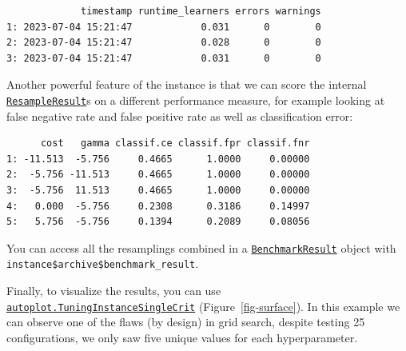 \begin{verbatim}
             timestamp runtime_learners errors warnings
1: 2023-07-04 15:21:47            0.031      0        0
2: 2023-07-04 15:21:47            0.028      0        0
3: 2023-07-04 15:21:47            0.031      0        0
\end{verbatim}

Another powerful feature of the instance is that we can score the
internal
\href{https://mlr3.mlr-org.com/reference/ResampleResult.html}{\texttt{ResampleResult}}s
on a different performance measure, for example looking at false
negative rate and false positive rate as well as classification error:

\begin{Shaded}
\begin{Highlighting}[]
\SpecialCharTok{$}
   \NormalTok{(}\NormalTok{(}\NormalTok{, }\NormalTok{)))[}\SpecialCharTok{:}\NormalTok{ ,}
\NormalTok{  .(cost, gamma, classif.ce, classif.fpr, classif.fnr)]}
\end{Highlighting}
\end{Shaded}

\begin{verbatim}
      cost   gamma classif.ce classif.fpr classif.fnr
1: -11.513  -5.756     0.4665      1.0000     0.00000
2:  -5.756 -11.513     0.4665      1.0000     0.00000
3:  -5.756  11.513     0.4665      1.0000     0.00000
4:   0.000  -5.756     0.2308      0.3186     0.14997
5:   5.756  -5.756     0.1394      0.2089     0.08056
\end{verbatim}

You can access all the resamplings combined in a
\href{https://mlr3.mlr-org.com/reference/BenchmarkResult.html}{\texttt{BenchmarkResult}}
object with \texttt{instance\$archive\$benchmark\_result}.

Finally, to visualize the results, you can use
\href{https://mlr3viz.mlr-org.com/reference/autoplot.TuningInstanceSingleCrit.html}{\texttt{autoplot.TuningInstanceSingleCrit}}
(Figure~\ref{fig-surface}). In this example we can observe one of the
flaws (by design) in grid search, despite testing 25 configurations, we
only saw five unique values for each hyperparameter.

\begin{Shaded}
\begin{Highlighting}[]
 \NormalTok{)}
\end{Highlighting}
\end{Shaded}

